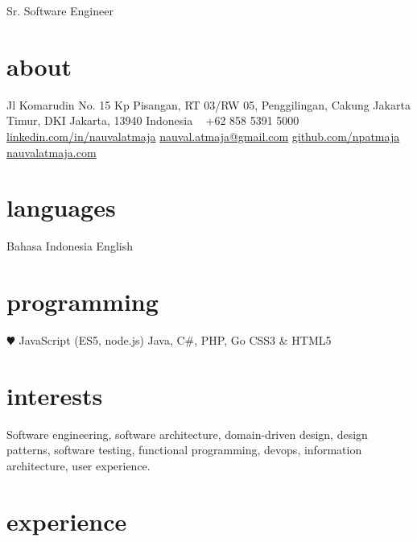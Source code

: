 \documentclass[]{friggeri-cv}
\begin{document}
       {Sr. Software Engineer}


\begin{aside}
  \section{about}
  	Jl Komarudin No. 15
  	Kp Pisangan, RT 03/RW 05,
  	Penggilingan, Cakung
  	Jakarta Timur,
  	DKI Jakarta, 13940
  	Indonesia
    ~
    +62 858 5391 5000
    ~
    \href{https://www.linkedin.com/in/nauvalatmaja/}{linkedin.com/in/nauvalatmaja}
    \href{mailto:nauval.atmaja@gmail.com}{nauval.atmaja@gmail.com}
    \href{https://github.com/npatmaja}{github.com/npatmaja}
    \href{http://nauvalatmaja.com}{nauvalatmaja.com}
  \section{languages}
  	Bahasa Indonesia
  	English
  \section{programming}
    {\color{red} $\varheartsuit$} JavaScript
    (ES5, node.js)
    Java, C\#, PHP, Go
    CSS3 \& HTML5
\end{aside}

\section{interests}

Software engineering, software architecture, domain-driven design,
design patterns, software testing, functional programming, devops, information architecture,
user experience.

\section{experience}
\end{document}
